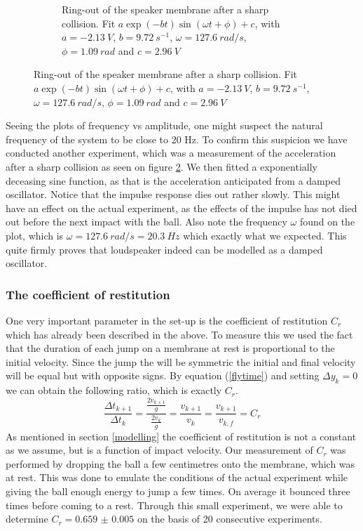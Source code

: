 \documentclass[12pt,oneside,a4paper]{article}
\numberwithin{equation}{section}
\begin{document}
{{{{\begin{figure}[h]
\begin{subfigure}[t]{0.49\textwidth}
		\caption{Ring-out of the speaker membrane after a sharp collision. Fit $a\exp(-bt)\sin(\omega t + \phi)+c$, with $a=\SI{-2.13}{V}$, $b=\SI{9.72}{s^{-1}}$, $\omega=\SI{127.6}{rad/s}$, $\phi=\SI{1.09}{rad}$ and $c=\SI{2.96}{V}$}
		\label{ringout}
	\end{subfigure}
\end{figure}
Seeing the plots of frequency vs amplitude, one might suspect the natural frequency of the system to be close to 20 Hz. To confirm this suspicion we have conducted another experiment, which was a measurement of the acceleration after a sharp collision as seen on figure \ref{ringout}. We then fitted a exponentially deceasing sine function, as that is the acceleration anticipated from a damped oscillator. Notice that the impulse response dies out rather slowly. This might have an effect on the actual experiment, as the effects of the impulse has not died out before the next impact with the ball. Also note the frequency $\omega$ found on the plot, which is $\omega = \SI{127.6}{rad/s} = \SI{20.3}{Hz}$ which exactly what we expected. This quite firmly proves that loudspeaker indeed can be modelled as a damped oscillator.
\subsubsection{The coefficient of restitution}
One very important parameter in the set-up is the coefficient of restitution 
$C_r$ which has already been described in the above. To measure this we used 
the fact that the duration of each jump on a membrane at rest is proportional 
to the initial velocity. Since the jump the will be symmetric the initial and 
final velocity will be equal but with opposite signs. By equation 
(\ref{flytime}) and setting $\Delta y_k=0$ we can obtain the following ratio, 
which is exactly $C_r$.
\begin{equation}
	\frac{\Delta t_{k+1}}{\Delta t_{k}}= \frac{\frac{2v_{k+1}}{g}}{\frac{2v_{k}}{g}} = \frac{v_{k+1}}{v_k} = \frac{v_{k+1}}{v_{k,f}} = C_r
\end{equation}
As mentioned in section \ref{modelling} the coefficient of restitution is not a 
constant as we assume, but is a function of impact velocity. Our measurement of 
$C_r$ was performed by dropping the ball a few centimetres onto the membrane, 
which was at rest. This was done to emulate the conditions of the actual 
experiment while giving the ball enough energy to jump a few times. On average 
it bounced three times before coming to a rest. Through this small experiment, 
we were able to determine $C_r= \num{0.659(5)}$ on the basis of 20 consecutive 
experiments. 
}}}}
\end{document}
